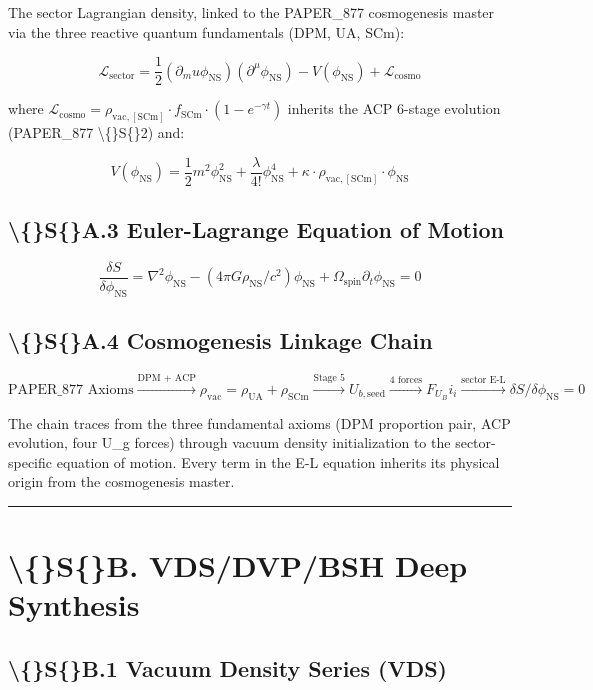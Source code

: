 \documentclass[11pt]{article}
\begin{document}
The sector Lagrangian density, linked to the PAPER\_877 cosmogenesis master via the three reactive quantum fundamentals (DPM, UA, SCm):

$$\mathcal{L}_{\mathrm{sector}} = \frac{1}{2}(\partial_mu \phi_{\mathrm{NS}})(\partial^\mu \phi_{\mathrm{NS}}) - V(\phi_{\mathrm{NS}}) + \mathcal{L}_{\mathrm{cosmo}}$$

where $\mathcal{L}_{\mathrm{cosmo}} = \rho_{\mathrm{vac,[SCm]}} \cdot f_{\mathrm{SCm}} \cdot (1 - e^{-\gamma t})$ inherits the ACP 6-stage evolution (PAPER\_877 \textbackslash\{\}S\{\}2) and:

$$V(\phi_{\mathrm{NS}}) = \frac{1}{2} m^2 \phi_{\mathrm{NS}}^2 + \frac{\lambda}{4!} \phi_{\mathrm{NS}}^4 + \kappa \cdot \rho_{\mathrm{vac,[SCm]}} \cdot \phi_{\mathrm{NS}}$$

\subsection*{\textbackslash\{\}S\{\}A.3 Euler-Lagrange Equation of Motion}

$$\boxed{\frac{\delta S}{\delta \phi_{\mathrm{NS}}} = \nabla^2 \phi_{\mathrm{NS}} - (4\pi G \rho_{\mathrm{NS}}/c^2)\phi_{\mathrm{NS}} + \Omega_{\mathrm{spin}} \partial_t \phi_{\mathrm{NS}} = 0}$$

\subsection*{\textbackslash\{\}S\{\}A.4 Cosmogenesis Linkage Chain}

$$\text{PAPER\_877 Axioms} \xrightarrow{\text{DPM + ACP}} \rho_{\mathrm{vac}} = \rho_{\mathrm{UA}} + \rho_{\mathrm{SCm}} \xrightarrow{\text{Stage 5}} U_{b,\mathrm{seed}} \xrightarrow{\text{4 forces}} F_U_Bi_i \xrightarrow{\text{sector E-L}} \delta S/\delta \phi_{\mathrm{NS}} = 0$$

The chain traces from the three fundamental axioms (DPM proportion pair, ACP evolution, four U\_g forces) through vacuum density initialization to the sector-specific equation of motion. Every term in the E-L equation inherits its physical origin from the cosmogenesis master.

\noindent\rule{\textwidth}{0.4pt}

\section*{\textbackslash\{\}S\{\}B. VDS/DVP/BSH Deep Synthesis}

\subsection*{\textbackslash\{\}S\{\}B.1 Vacuum Density Series (VDS)}
\end{document}
